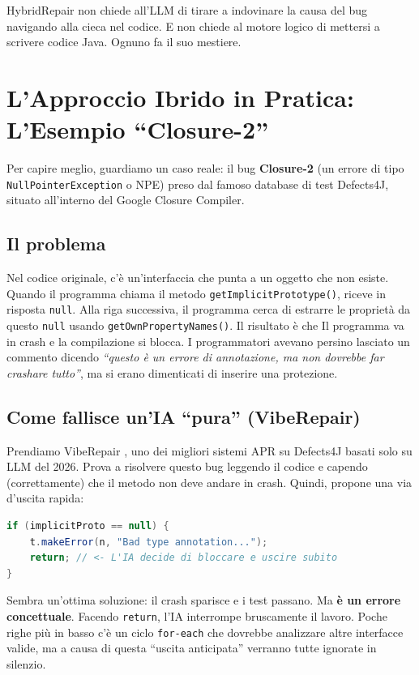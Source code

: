 HybridRepair non chiede all'LLM di tirare a indovinare la causa del bug navigando alla cieca 
nel codice. E non chiede al motore logico di mettersi a scrivere codice Java. Ognuno fa il suo mestiere.

\section{L'Approccio Ibrido in Pratica: L'Esempio ``Closure-2''}

Per capire meglio, guardiamo un caso reale: il bug \textbf{Closure-2} (un errore di tipo 
\texttt{NullPointerException} o NPE) preso dal famoso database di test Defects4J, situato all'interno 
del Google Closure Compiler.

\subsection{Il problema}

Nel codice originale, c'è un'interfaccia che punta a un oggetto che non esiste. Quando il programma 
chiama il metodo \texttt{getImplicitPrototype()}, riceve in risposta  \texttt{null}. Alla riga 
successiva, il programma cerca di estrarre le proprietà da questo \texttt{null} usando \texttt{getOwnPropertyNames()}. 
Il risultato è che Il programma va in crash e la compilazione si blocca. I programmatori avevano persino lasciato 
un commento dicendo \textit{``questo è un errore di annotazione, ma non dovrebbe far crashare tutto''}, 
ma si erano dimenticati di inserire una protezione.

\subsection{Come fallisce un'IA ``pura'' (VibeRepair)}

Prendiamo VibeRepair \cite{zhu2026specification}, uno dei migliori sistemi APR su Defects4J basati solo su LLM del 2026. Prova a risolvere questo 
bug leggendo il codice e capendo (correttamente) che il metodo non deve andare in crash. Quindi, 
propone una via d'uscita rapida:

\begin{lstlisting}[language=Java]
if (implicitProto == null) {
    t.makeError(n, "Bad type annotation...");
    return; // <- L'IA decide di bloccare e uscire subito
}
\end{lstlisting}

Sembra un'ottima soluzione: il crash sparisce e i test passano. Ma \textbf{è un errore concettuale}. 
Facendo \texttt{return}, l'IA interrompe bruscamente il lavoro. Poche righe più in basso c'è un ciclo 
\texttt{for-each} che dovrebbe analizzare altre interfacce valide, ma a causa di questa ``uscita anticipata'' 
verranno tutte ignorate in silenzio.

